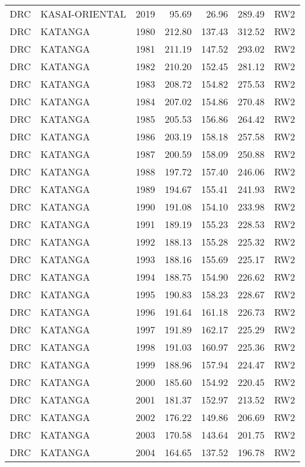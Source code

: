 \begin{longtable}{lllrrrl}
  DRC & KASAI-ORIENTAL & 2019 & 95.69 & 26.96 & 289.49 & RW2 \\ 
  DRC & KATANGA & 1980 & 212.80 & 137.43 & 312.52 & RW2 \\ 
  DRC & KATANGA & 1981 & 211.19 & 147.52 & 293.02 & RW2 \\ 
  DRC & KATANGA & 1982 & 210.20 & 152.45 & 281.12 & RW2 \\ 
  DRC & KATANGA & 1983 & 208.72 & 154.82 & 275.53 & RW2 \\ 
  DRC & KATANGA & 1984 & 207.02 & 154.86 & 270.48 & RW2 \\ 
  DRC & KATANGA & 1985 & 205.53 & 156.86 & 264.42 & RW2 \\ 
  DRC & KATANGA & 1986 & 203.19 & 158.18 & 257.58 & RW2 \\ 
  DRC & KATANGA & 1987 & 200.59 & 158.09 & 250.88 & RW2 \\ 
  DRC & KATANGA & 1988 & 197.72 & 157.40 & 246.06 & RW2 \\ 
  DRC & KATANGA & 1989 & 194.67 & 155.41 & 241.93 & RW2 \\ 
  DRC & KATANGA & 1990 & 191.08 & 154.10 & 233.98 & RW2 \\ 
  DRC & KATANGA & 1991 & 189.19 & 155.23 & 228.53 & RW2 \\ 
  DRC & KATANGA & 1992 & 188.13 & 155.28 & 225.32 & RW2 \\ 
  DRC & KATANGA & 1993 & 188.16 & 155.69 & 225.17 & RW2 \\ 
  DRC & KATANGA & 1994 & 188.75 & 154.90 & 226.62 & RW2 \\ 
  DRC & KATANGA & 1995 & 190.83 & 158.23 & 228.67 & RW2 \\ 
  DRC & KATANGA & 1996 & 191.64 & 161.18 & 226.73 & RW2 \\ 
  DRC & KATANGA & 1997 & 191.89 & 162.17 & 225.29 & RW2 \\ 
  DRC & KATANGA & 1998 & 191.03 & 160.97 & 225.36 & RW2 \\ 
  DRC & KATANGA & 1999 & 188.96 & 157.94 & 224.47 & RW2 \\ 
  DRC & KATANGA & 2000 & 185.60 & 154.92 & 220.45 & RW2 \\ 
  DRC & KATANGA & 2001 & 181.37 & 152.97 & 213.52 & RW2 \\ 
  DRC & KATANGA & 2002 & 176.22 & 149.86 & 206.69 & RW2 \\ 
  DRC & KATANGA & 2003 & 170.58 & 143.64 & 201.75 & RW2 \\ 
  DRC & KATANGA & 2004 & 164.65 & 137.52 & 196.78 & RW2 \\ 

\end{longtable}

